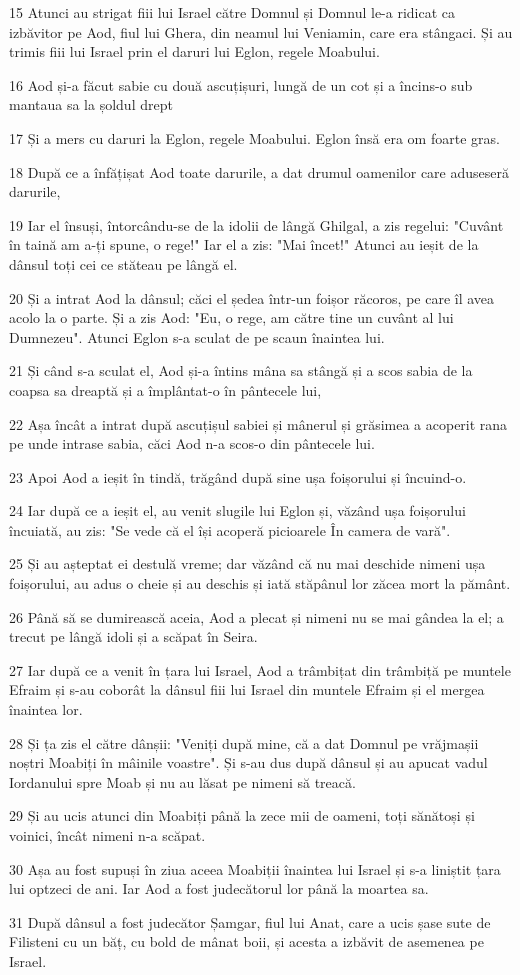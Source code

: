 \par 15 Atunci au strigat fiii lui Israel către Domnul și Domnul le-a ridicat ca izbăvitor pe Aod, fiul lui Ghera, din neamul lui Veniamin, care era stângaci. Și au trimis fiii lui Israel prin el daruri lui Eglon, regele Moabului.
\par 16 Aod și-a făcut sabie cu două ascuțișuri, lungă de un cot și a încins-o sub mantaua sa la șoldul drept
\par 17 Și a mers cu daruri la Eglon, regele Moabului. Eglon însă era om foarte gras.
\par 18 După ce a înfățișat Aod toate darurile, a dat drumul oamenilor care aduseseră darurile,
\par 19 Iar el însuși, întorcându-se de la idolii de lângă Ghilgal, a zis regelui: "Cuvânt în taină am a-ți spune, o rege!" Iar el a zis: "Mai încet!" Atunci au ieșit de la dânsul toți cei ce stăteau pe lângă el.
\par 20 Și a intrat Aod la dânsul; căci el ședea într-un foișor răcoros, pe care îl avea acolo la o parte. Și a zis Aod: "Eu, o rege, am către tine un cuvânt al lui Dumnezeu". Atunci Eglon s-a sculat de pe scaun înaintea lui.
\par 21 Și când s-a sculat el, Aod și-a întins mâna sa stângă și a scos sabia de la coapsa sa dreaptă și a împlântat-o în pântecele lui,
\par 22 Așa încât a intrat după ascuțișul sabiei și mânerul și grăsimea a acoperit rana pe unde intrase sabia, căci Aod n-a scos-o din pântecele lui.
\par 23 Apoi Aod a ieșit în tindă, trăgând după sine ușa foișorului și încuind-o.
\par 24 Iar după ce a ieșit el, au venit slugile lui Eglon și, văzând ușa foișorului încuiată, au zis: "Se vede că el își acoperă picioarele În camera de vară".
\par 25 Și au așteptat ei destulă vreme; dar văzând că nu mai deschide nimeni ușa foișorului, au adus o cheie și au deschis și iată stăpânul lor zăcea mort la pământ.
\par 26 Până să se dumirească aceia, Aod a plecat și nimeni nu se mai gândea la el; a trecut pe lângă idoli și a scăpat în Seira.
\par 27 Iar după ce a venit în țara lui Israel, Aod a trâmbițat din trâmbiță pe muntele Efraim și s-au coborât la dânsul fiii lui Israel din muntele Efraim și el mergea înaintea lor.
\par 28 Și ța zis el către dânșii: "Veniți după mine, că a dat Domnul pe vrăjmașii noștri Moabiți în mâinile voastre". Și s-au dus după dânsul și au apucat vadul Iordanului spre Moab și nu au lăsat pe nimeni să treacă.
\par 29 Și au ucis atunci din Moabiți până la zece mii de oameni, toți sănătoși și voinici, încât nimeni n-a scăpat.
\par 30 Așa au fost supuși în ziua aceea Moabiții înaintea lui Israel și s-a liniștit țara lui optzeci de ani. Iar Aod a fost judecătorul lor până la moartea sa.
\par 31 După dânsul a fost judecător Șamgar, fiul lui Anat, care a ucis șase sute de Filisteni cu un băț, cu bold de mânat boii, și acesta a izbăvit de asemenea pe Israel.

